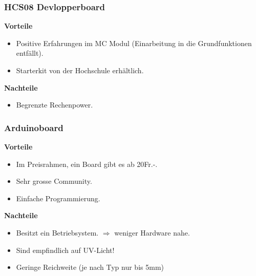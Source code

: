 
\subsubsection{HCS08 Devlopperboard}
\textbf {Vorteile}
\begin{itemize}
\item Positive Erfahrungen im MC Modul (Einarbeitung in die Grundfunktionen entfällt).
\item Starterkit von der Hochschule erhältlich. \\
\end{itemize}
\textbf {Nachteile}
\begin{itemize}
\item Begrenzte Rechenpower.	
\end{itemize}

\subsubsection{Arduinoboard}
\textbf {Vorteile}
\begin{itemize}
\item Im Preisrahmen, ein Board gibt es ab 20Fr.-.
\item Sehr grosse Community.
\item Einfache Programmierung.\\
\end{itemize}
\textbf {Nachteile}
\begin{itemize}
\item Besitzt ein Betriebsystem. $\Rightarrow$ weniger Hardware nahe.
\item Sind empfindlich auf UV-Licht!
\item Geringe Reichweite (je nach Typ nur bis 5mm)
\end{itemize}

